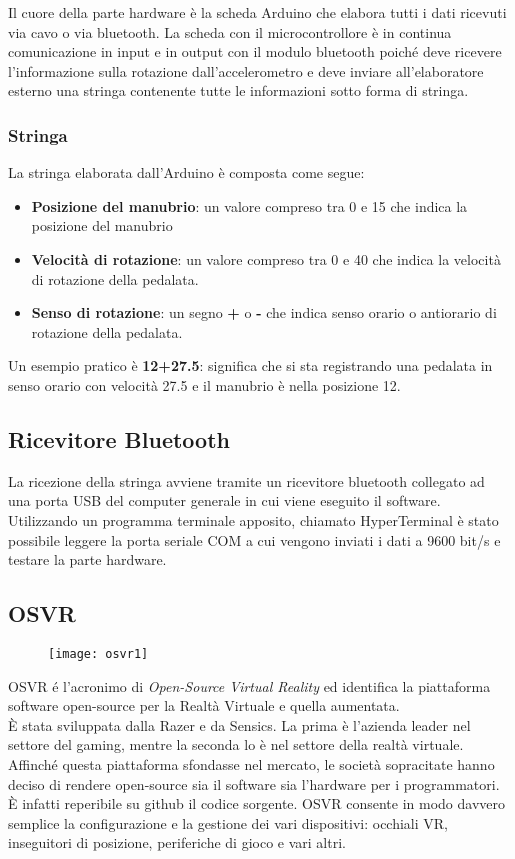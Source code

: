 Il cuore della parte hardware è la scheda Arduino che elabora tutti i dati ricevuti via cavo o via bluetooth. La scheda con il microcontrollore è in continua comunicazione in input e in output con il modulo bluetooth poiché deve ricevere l'informazione sulla rotazione dall'accelerometro e deve inviare all'elaboratore esterno una stringa contenente tutte le informazioni sotto forma di stringa.
\subsubsection{Stringa}
La stringa elaborata dall'Arduino è composta come segue:
\begin{itemize}
  \item \textbf{Posizione del manubrio}: un valore compreso tra 0 e 15 che indica la posizione del manubrio
  \item \textbf{Velocità di rotazione}: un valore compreso tra 0 e 40 che indica la velocità di rotazione della pedalata.
  \item \textbf{Senso di rotazione}: un segno \textbf{+} o \textbf{-} che indica senso orario o antiorario di rotazione della pedalata.
\end{itemize}

\noindent Un esempio pratico è \textbf{12+27.5}: significa che si sta registrando una pedalata in senso orario con velocità 27.5 e il manubrio è nella posizione 12.

\subsection{Ricevitore Bluetooth}
La ricezione della stringa avviene tramite un ricevitore bluetooth collegato ad una porta USB del computer generale in cui viene eseguito il software. Utilizzando un programma terminale apposito, chiamato HyperTerminal è stato possibile leggere la porta seriale COM a cui vengono inviati i dati a 9600 bit/s e testare la parte hardware.
\subsection{OSVR}
\begin{figure}[htb]
    \centering
    \vspace{-0.7cm}
    \texttt{[image: osvr1]}
    \vspace{-0.3cm}
\end{figure}
\noindent OSVR é l'acronimo di \textit{Open-Source Virtual Reality} ed identifica la piattaforma software open-source per la Realtà Virtuale e quella aumentata. \\È stata sviluppata dalla Razer e da Sensics. La prima è l'azienda leader nel settore del gaming, mentre la seconda lo è nel settore della realtà virtuale. Affinché questa piattaforma sfondasse nel mercato, le società sopracitate hanno deciso di rendere open-source sia il software sia l'hardware per i programmatori. È infatti reperibile su github il codice sorgente. OSVR consente in modo davvero semplice la configurazione e la gestione dei vari dispositivi: occhiali VR, inseguitori di posizione, periferiche di gioco e vari altri. 
